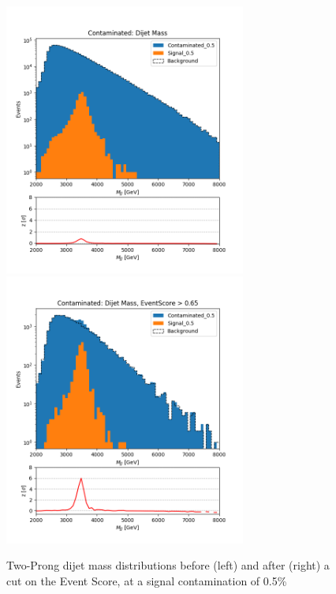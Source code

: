 \documentclass[12pt, a4paper]{article}
\begin{document}
\begin{figure}[H]
	\begin{center}
		\includegraphics[width=225pt]{imgs/2Prong_Contaminated_0p5_JJ_Mass_Multi.png}
		\includegraphics[width=225pt]{imgs/2Prong_Contaminated_0p5_JJ_Mass_EventScore0p65_Multi.png}
	\end{center}
	\caption{Two-Prong dijet mass distributions before (left) and after (right) a cut on the Event Score, at a signal contamination of 0.5\%}
	\label{fig:2p_dijet}
\end{figure}
\end{document}
